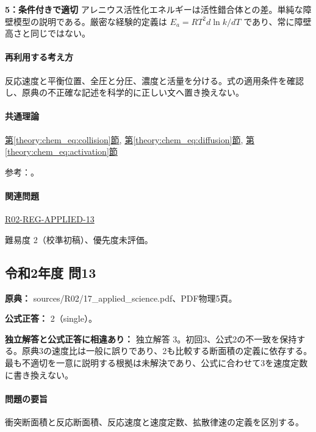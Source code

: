 \noindent\textbf{5：条件付きで適切} アレニウス活性化エネルギーは活性錯合体との差。単純な障壁模型の説明である。厳密な経験的定義は \(E_a=RT^2d\ln k/dT\) であり、常に障壁高さと同じではない。\par

\paragraph{再利用する考え方} 反応速度と平衡位置、全圧と分圧、濃度と活量を分ける。式の適用条件を確認し、原典の不正確な記述を科学的に正しい文へ置き換えない。

\paragraph{共通理論} \hyperref[theory:chem_eq:collision]{第\ref*{theory:chem_eq:collision}節}, \hyperref[theory:chem_eq:diffusion]{第\ref*{theory:chem_eq:diffusion}節}, \hyperref[theory:chem_eq:activation]{第\ref*{theory:chem_eq:activation}節}

\par 参考：\cite{iupac_greenbook2012}。

\paragraph{関連問題} \hyperref[q:r02-reg-applied-13]{R02-REG-APPLIED-13}

\par 難易度 2（校準初稿）、優先度未評価。

\subsection{令和2年度 問13}
\label{q:r02-reg-applied-13}

\noindent\textbf{原典：} sources/R02/17\_applied\_science.pdf、PDF物理5頁。

\textbf{公式正答：} 2（single）。

\par\textbf{独立解答と公式正答に相違あり：} 独立解答 3。初回3、公式2の不一致を保持する。原典3の速度比は一般に誤りであり、2も比較する断面積の定義に依存する。最も不適切を一意に説明する根拠は未解決であり、公式に合わせて3を速度定数に書き換えない。

\paragraph{問題の要旨} 衝突断面積と反応断面積、反応速度と速度定数、拡散律速の定義を区別する。

